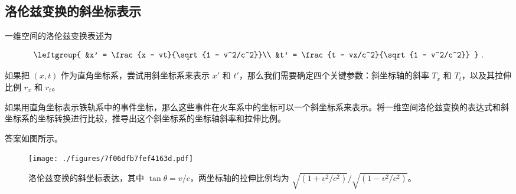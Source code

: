 
\subsection{洛伦兹变换的斜坐标表示}

一维空间的洛伦兹变换表述为

\begin{equation}\label{eq_SROb_1}
\leftgroup{
&x' = \frac{x - vt}{\sqrt{1 - v^2/c^2}}\\
&t' = \frac{t - vx/c^2}{\sqrt{1 - v^2/c^2}}
}~.
\end{equation}

如果把 $(x,t)$ 作为直角坐标系，尝试用斜坐标系来表示 $x'$ 和 $t'$，那么我们需要确定四个关键参数：斜坐标轴的斜率 $T_x$ 和 $T_t$，以及其拉伸比例 $r_x$ 和 $r_t$。

\begin{exercise}{}

如果用直角坐标表示铁轨系中的事件坐标，那么这些事件在火车系中的坐标可以一个斜坐标系来表示。将一维空间洛伦兹变换的表达式和斜坐标系的坐标转换进行比较，推导出这个斜坐标系的坐标轴斜率和拉伸比例。

\end{exercise}

答案如图所示。

\begin{figure}[ht]
\centering
\texttt{[image: ./figures/7f06dfb7fef4163d.pdf]}
\caption{洛伦兹变换的斜坐标表达，其中 $\tan{\theta}=v/c$，两坐标轴的拉伸比例均为 $\sqrt{(1+v^2/c^2)}/\sqrt{(1-v^2/c^2)}$。} \label{fig_SROb_1}
\end{figure}




